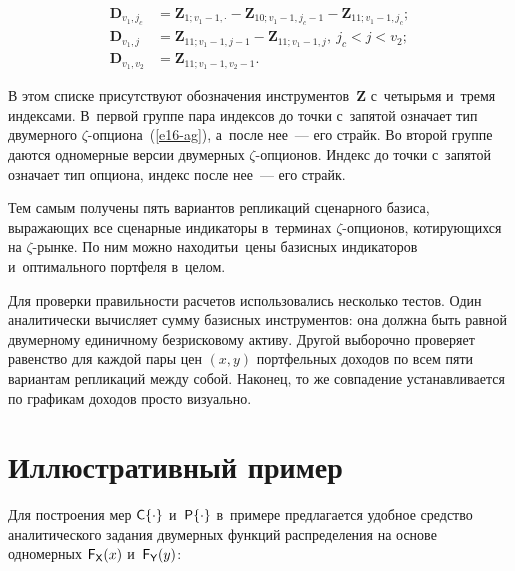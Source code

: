 \begin{multicols}{2}
  \vspace*{-12pt}
    
    \pagebreak
    
    
  \noindent
    \begin{align*}
          \boldsymbol{D}_{v_1,j_c} &= \boldsymbol{Z}_{1;v_1-1,\cdot} - \boldsymbol{Z}_{10;v_1-1,j_c-1} - \boldsymbol{Z}_{11;v_1-1,j_c}; \\
  \boldsymbol{D}_{v_1,j} &= \boldsymbol{Z}_{11;v_1-1,j-1} - \boldsymbol{Z}_{11;v_1-1,j}, \  j_c < j < v_2; \\
  \boldsymbol{D}_{v_1,v_2}& = \boldsymbol{Z}_{11;v_1-1,v_2-1}. 
  \end{align*}
  
  
  \vspace*{-3pt}
  
  \noindent
  В этом списке присутствуют обозначения инструментов~$\boldsymbol{Z}$ 
с~четырьмя и~тремя индексами. В~первой группе пара индексов до точки 
с~запятой означает тип двумерного $\zeta$-оп\-ци\-о\-на~(\ref{e16-ag}), а~после 
нее~--- его страйк. Во второй группе даются одномерные версии двумерных 
$\zeta$-оп\-ци\-о\-нов. Индекс до точки с~запятой означает тип опциона, индекс 
после нее~--- его страйк. 
  
  Тем самым получены пять вариантов репликаций сценарного базиса, 
выражающих все сценарные индикаторы в~терминах $\zeta$-оп\-ци\-о\-нов, 
ко\-ти\-ру\-ющих\-ся на $\zeta$-рын\-ке. По ним можно находить\linebreak и~\mbox{цены} базисных 
индикаторов и~оптимального портфеля в~целом. 
  
  Для проверки правильности расчетов использовались несколько тестов. Один 
аналитически вычисляет сумму базисных инструментов: она должна быть 
равной двумерному единичному безрисковому активу. Другой выборочно 
проверяет равенство для каждой пары цен $(x, y)$ портфельных доходов по 
всем пяти вариантам репликаций между собой. Наконец, то же совпадение 
устанавливается по графикам доходов просто визуально. 

  
  \section{Иллюстративный пример}
  
  
  Для построения мер ${\sf C}\{\cdot\}$ и~${\sf P}\{\cdot \}$ в~примере 
предлагается удобное средство аналитического задания двумерных функций 
распределения на основе одномерных ${\sf F}_{\sf X}(x)$ и~${\sf F}_{\sf Y}(y)$: 


\end{multicols}
